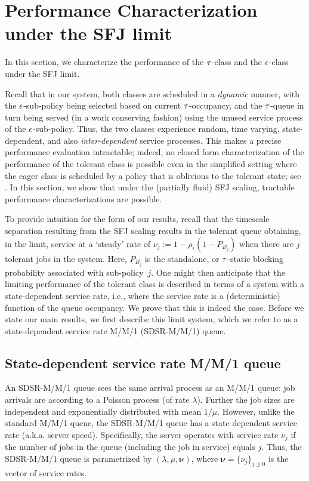 \section{Performance Characterization under the SFJ limit}
\label{sec:tolerant}

In this section, we characterize the performance of the ${\tau}$-class and
the ${ \epsilon }$-class under the SFJ limit.

Recall that in our system, both classes are scheduled in a
\emph{dynamic} manner, with the ${ \epsilon }$-sub-policy being selected based
on current ${\tau}$-occupancy, and the ${\tau}$-queue in turn being served (in
a work conserving fashion) using the unused service process of the
${ \epsilon }$-sub-policy. Thus, the two classes experience random, time
varying, state-dependent, and also \emph{inter-dependent} service
processes. This makes a precise performance evaluation intractable;
indeed, no closed form characterization of the performance of the
tolerant class is possible even in the simplified setting where the
eager class is scheduled by a policy that is oblivious to the tolerant
state; see \cite{Mahabhashyam05,ANOR}. In this section, we show that
under the (partially fluid) SFJ scaling, tractable performance
characterizations are possible.


To provide intuition for the form of our results, recall that the
timescale separation resulting from the SFJ scaling results in the
tolerant queue obtaining, in the limit, service at a `steady' rate of
$\nu_{j} := 1 - \rho_\epsilon \left(1 - P_{B_j}\right)$ when there are
$j$ tolerant jobs in the system. Here, $P_{B_j}$ is the standalone, or
${\tau}$-static blocking probability associated with sub-policy~$j.$ One
might then anticipate that the limiting performance of the tolerant
class is described in terms of a system with a state-dependent service
rate, i.e., where the service rate is a (deterministic) function of the
queue occupancy. We prove that this is indeed the case. Before we
state our main results, we first describe this limit system, which we
refer to as a state-dependent service rate M/M/1 (SDSR-M/M/1) queue.


\subsection{State-dependent service rate M/M/1 queue}

An SDSR-M/M/1 queue sees the same arrival process as an M/M/1 queue:
job arrivals are according to a Poisson process (of rate
$\lambda$). Further the job sizes are independent and exponentially
distributed with mean $1/\mu$. However, unlike the standard M/M/1
queue, the SDSR-M/M/1 queue has a state dependent service rate
(a.k.a. server speed). Specifically, the server operates with service
rate $\nu_j$ if the number of jobs in the queue (including the job in
service) equals $j.$ Thus, the SDSR-M/M/1 queue is parametrized by
$(\lambda, \mu, \bm{\nu})$, where $\bm{\nu} = \{\nu_j\}_{j \geq 0}$ is
the vector of service rates.


